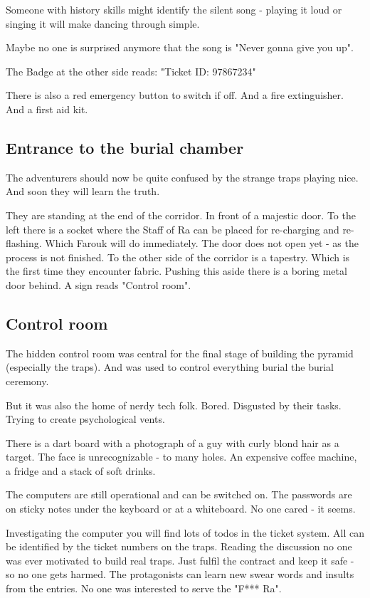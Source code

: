 Someone with history skills might identify the silent song - playing it loud or singing it will make dancing through simple.

Maybe no one is surprised anymore that the song is "Never gonna give you up".

The Badge at the other side reads: "Ticket ID: 97867234"

There is also a red emergency button to switch if off. And a fire extinguisher. And a first aid kit.

\subsection{Entrance to the burial chamber}

The adventurers should now be quite confused by the strange traps playing nice. And soon they will learn the truth.

They are standing at the end of the corridor. In front of a majestic door. To the left there is a socket where the Staff of Ra can be placed for re-charging and re-flashing. Which Farouk will do immediately. The door does not open yet - as the process is not finished.
To the other side of the corridor is a tapestry. Which is the first time they encounter fabric. Pushing this aside there is a boring metal door behind. A sign reads "Control room".

\subsection{Control room}

The hidden control room was central for the final stage of building the pyramid (especially the traps). And was used to control everything burial the burial ceremony.

But it was also the home of nerdy tech folk. Bored. Disgusted by their tasks. Trying to create psychological vents.

There is a dart board with a photograph of a guy with curly blond hair as a target. The face is unrecognizable - to many holes.
An expensive coffee machine, a fridge and a stack of soft drinks.

The computers are still operational and can be switched on. The passwords are on sticky notes under the keyboard or at a whiteboard. No one cared - it seems.

Investigating the computer you will find lots of todos in the ticket system. All can be identified by the ticket numbers on the traps. Reading the discussion no one was ever motivated to build real traps. Just fulfil the contract and keep it safe - so no one gets harmed.
The protagonists can learn new swear words and insults from the entries. No one was interested to serve the "F*** Ra".

